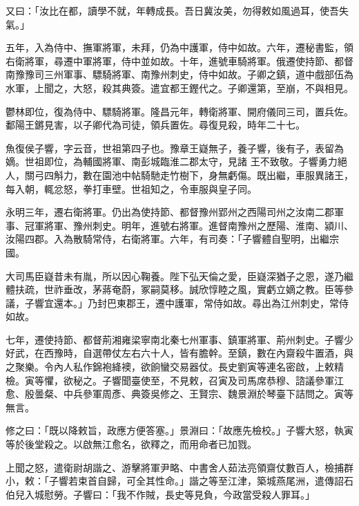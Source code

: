 \begin{pinyinscope}
 又曰：「汝比在都，讀學不就，年轉成長。吾日冀汝美，勿得敕如風過耳，使吾失氣。」



 五年，入為侍中、撫軍將軍，未拜，仍為中護軍，侍中如故。六年，遷秘書監，領右衛將軍，尋遷中軍將軍，侍中並如故。十年，進號車騎將軍。俄遷使持節、都督南豫豫司三州軍事、驃騎將軍、南豫州刺史，侍中如故。子卿之鎮，道中戲部伍為水軍，上聞之，大怒，殺其典簽。遣宜都王鏗代之。子卿還第，至崩，不與相見。



 鬱林即位，復為侍中、驃騎將軍。隆昌元年，轉衛將軍、開府儀同三司，置兵佐。鄱陽王鏘見害，以子卿代為司徒，領兵置佐。尋復見殺，時年二十七。



 魚復侯子響，字云音，世祖第四子也。豫章王嶷無子，養子響，後有子，表留為嫡。世祖即位，為輔國將軍、南彭城臨淮二郡太守，見諸
 王不致敬。子響勇力絕人，關弓四斛力，數在園池中帖騎馳走竹樹下，身無虧傷。既出繼，車服異諸王，每入朝，輒忿怒，拳打車壁。世祖知之，令車服與皇子同。



 永明三年，遷右衛將軍。仍出為使持節、都督豫州郢州之西陽司州之汝南二郡軍事、冠軍將軍、豫州刺史。明年，進號右將軍。進督南豫州之歷陽、淮南、潁川、汝陽四郡。入為散騎常侍，右衛將軍。六年，有司奏：「子響體自聖明，出繼宗國。



 大司馬臣嶷昔未有胤，所以因心鞠養。陛下弘天倫之愛，臣嶷深猶子之恩，遂乃繼體扶疏，世祚垂改，茅蔣奄蔚，冢嗣莫移。誠欣惇睦之風，實虧立嫡之教。臣等參議，子響宜還本。」乃封巴東郡王，遷中護軍，常侍如故。尋出為江州刺史，常侍如故。



 七年，遷使持節、都督荊湘雍梁寧南北秦七州軍事、鎮軍將軍、荊州刺史。子響少好武，在西豫時，自選帶仗左右六十人，皆有膽幹。至鎮，數在內齋殺牛置酒，與
 之聚樂。令內人私作錦袍絳襖，欲餉蠻交易器仗。長史劉寅等連名密啟，上敕精檢。寅等懼，欲秘之。子響聞臺使至，不見敕，召寅及司馬席恭穆、諮議參軍江愈、殷曇粲、中兵參軍周彥、典簽吳修之、王賢宗、魏景淵於琴臺下詰問之。寅等無言。



 修之曰：「既以降敕旨，政應方便答塞。」景淵曰：「故應先檢校。」子響大怒，執寅等於後堂殺之。以啟無江愈名，欲釋之，而用命者已加戮。



 上聞之怒，遣衛尉胡諧之、游擊將軍尹略、中書舍人茹法亮領齋仗數百人，檢捕群小，敕：「子響若束首自歸，可全其性命。」諧之等至江津，築城燕尾洲，遣傳詔石伯兒入城慰勞。子響曰：「我不作賊，長史等見負，今政當受殺人罪耳。」




\end{pinyinscope}
